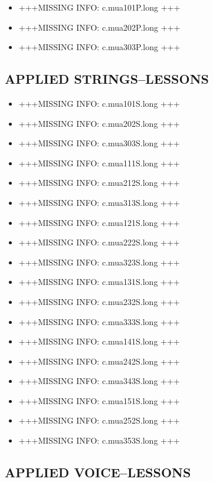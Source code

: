 \documentclass[
  letterpaper,
]{scrbook}
\providecommand{\tightlist}{%
  \setlength{\itemsep}{0pt}\setlength{\parskip}{0pt}}
\begin{document}
\begin{itemize}
\tightlist
\item
  +++MISSING INFO: c.mua101P.long +++
\item
  +++MISSING INFO: c.mua202P.long +++
\item
  +++MISSING INFO: c.mua303P.long +++
\end{itemize}

\subsection{APPLIED STRINGS--LESSONS}\label{applied-stringslessons}

\begin{itemize}
\tightlist
\item
  +++MISSING INFO: c.mua101S.long +++
\item
  +++MISSING INFO: c.mua202S.long +++
\item
  +++MISSING INFO: c.mua303S.long +++
\item
  +++MISSING INFO: c.mua111S.long +++
\item
  +++MISSING INFO: c.mua212S.long +++
\item
  +++MISSING INFO: c.mua313S.long +++
\item
  +++MISSING INFO: c.mua121S.long +++
\item
  +++MISSING INFO: c.mua222S.long +++
\item
  +++MISSING INFO: c.mua323S.long +++
\item
  +++MISSING INFO: c.mua131S.long +++
\item
  +++MISSING INFO: c.mua232S.long +++
\item
  +++MISSING INFO: c.mua333S.long +++
\item
  +++MISSING INFO: c.mua141S.long +++
\item
  +++MISSING INFO: c.mua242S.long +++
\item
  +++MISSING INFO: c.mua343S.long +++
\item
  +++MISSING INFO: c.mua151S.long +++
\item
  +++MISSING INFO: c.mua252S.long +++
\item
  +++MISSING INFO: c.mua353S.long +++
\end{itemize}

\subsection{APPLIED VOICE--LESSONS}\label{applied-voicelessons}
\end{document}
